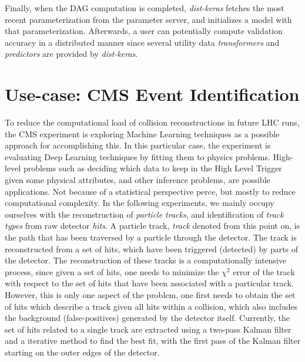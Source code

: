 Finally, when the DAG computation is completed, \emph{dist-keras} fetches the most recent parameterization from the parameter server, and initializes a model with that parameterization. Afterwards, a user can potentially compute validation accuracy in a distributed manner since several utility data \emph{transformers} and \emph{predictors} are provided by \emph{dist-keras}.

\section{Use-case: CMS Event Identification}
\label{sec:experiment_track_reconstruction}

To reduce the computational load of collision reconstructions in future LHC runs, the CMS experiment is exploring Machine Learning techniques as a possible approach for accomplishing this. In this particular case, the experiment is evaluating Deep Learning techniques by fitting them to physics problems. High-level problems such as deciding which data to keep in the High Level Trigger given some physical attributes, and other inference problems, are possible applications. Not because of a statistical perspective perce, but mostly to reduce computational complexity. In the following experiments, we mainly occupy ourselves with the reconstruction of \emph{particle tracks}, and identification of \emph{track types} from raw detector \emph{hits}. A particle track, \emph{track} denoted from this point on, is the path that has been traversed by a particle through the detector. The track is reconstructed from a set of hits, which have been triggered (detected) by parts of the detector. The reconstruction of these tracks is a computationally intensive process, since given a set of hits, one needs to minimize the $\chi^2$ error of the track with respect to the set of hits that have been associated with a particular track. However, this is only one aspect of the problem, one first needs to obtain the set of hits which describe a track given all hits within a collision, which also includes the background (false-positives) generated by the detector itself. Currently, the set of hits related to a single track are extracted using a two-pass Kalman filter and a iterative method to find the best fit, with the first pass of the Kalman filter starting on the outer edges of the detector.\\

